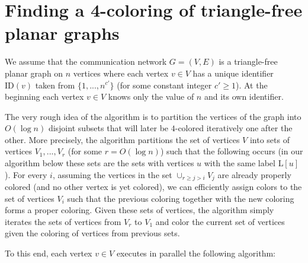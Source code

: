 \documentclass{article}
\theoremstyle{definition}
\begin{document}
 \section{Finding a 4-coloring of triangle-free planar graphs}
\label{sec:4-coloring}

We assume that the communication network $G = (V,E)$ is a triangle-free planar graph on $n$ vertices where each vertex $v \in V$ has a unique identifier $\text{ID}(v)$ taken from $\{1,...,n^{c'}\}$ (for some constant integer $c' \ge 1$). At the beginning each vertex $v \in V$ knows only the value of $n$ and its own identifier.

The very rough idea of the algorithm is to partition the vertices of the graph into $O(\log n)$ disjoint subsets that will later be $4$-colored iteratively one after the other.
More precisely, the algorithm partitions the set of vertices $V$ into sets of vertices $V_1,...,V_{r}$ (for some $r = O(\log{n})$) such that the following occurs (in our algorithm below these sets are the sets with vertices $u$ with the same label $\text{L}[u]$).
For every $i$, assuming the vertices in the set $\cup_{r\geq j>i}{V_{j}}$ are already properly colored (and no other vertex is yet colored), we can efficiently assign colors to the set of vertices $V_i$ such that the previous coloring together with the new coloring forms a proper coloring.
Given these sets of vertices, the algorithm simply iterates the sets of vertices from $V_{r}$ to $V_1$ and color the current set of vertices given the coloring of vertices from previous sets.

To this end, each vertex $v \in V$ executes in parallel the following algorithm:\medskip \smallskip
\end{document}
